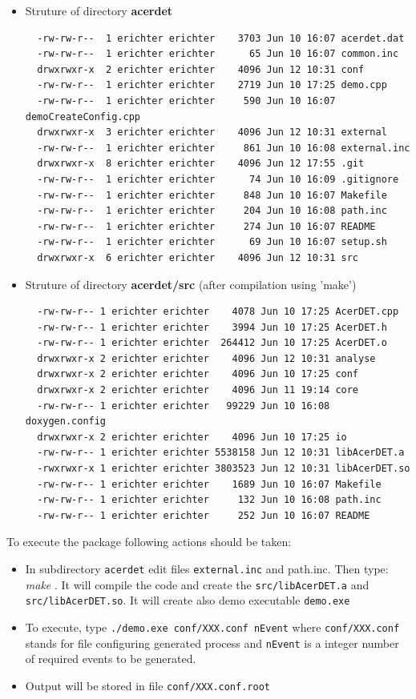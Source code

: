 \begin{itemize}
\item
Struture of directory {\bf acerdet}
{\scriptsize
\begin{verbatim}  
  -rw-rw-r--  1 erichter erichter    3703 Jun 10 16:07 acerdet.dat
  -rw-rw-r--  1 erichter erichter      65 Jun 10 16:07 common.inc
  drwxrwxr-x  2 erichter erichter    4096 Jun 12 10:31 conf
  -rw-rw-r--  1 erichter erichter    2719 Jun 10 17:25 demo.cpp
  -rw-rw-r--  1 erichter erichter     590 Jun 10 16:07 demoCreateConfig.cpp
  drwxrwxr-x  3 erichter erichter    4096 Jun 12 10:31 external
  -rw-rw-r--  1 erichter erichter     861 Jun 10 16:08 external.inc
  drwxrwxr-x  8 erichter erichter    4096 Jun 12 17:55 .git
  -rw-rw-r--  1 erichter erichter      74 Jun 10 16:09 .gitignore
  -rw-rw-r--  1 erichter erichter     848 Jun 10 16:07 Makefile
  -rw-rw-r--  1 erichter erichter     204 Jun 10 16:08 path.inc
  -rw-rw-r--  1 erichter erichter     274 Jun 10 16:07 README
  -rw-rw-r--  1 erichter erichter      69 Jun 10 16:07 setup.sh
  drwxrwxr-x  6 erichter erichter    4096 Jun 12 10:31 src
\end{verbatim} 
}
\item
Struture of directory {\bf acerdet/src} (after compilation using 'make')
{\scriptsize
\begin{verbatim}  
  -rw-rw-r-- 1 erichter erichter    4078 Jun 10 17:25 AcerDET.cpp
  -rw-rw-r-- 1 erichter erichter    3994 Jun 10 17:25 AcerDET.h
  -rw-rw-r-- 1 erichter erichter  264412 Jun 10 17:25 AcerDET.o
  drwxrwxr-x 2 erichter erichter    4096 Jun 12 10:31 analyse
  drwxrwxr-x 2 erichter erichter    4096 Jun 10 17:25 conf
  drwxrwxr-x 2 erichter erichter    4096 Jun 11 19:14 core
  -rw-rw-r-- 1 erichter erichter   99229 Jun 10 16:08 doxygen.config
  drwxrwxr-x 2 erichter erichter    4096 Jun 10 17:25 io
  -rw-rw-r-- 1 erichter erichter 5538158 Jun 12 10:31 libAcerDET.a
  -rwxrwxr-x 1 erichter erichter 3803523 Jun 12 10:31 libAcerDET.so
  -rw-rw-r-- 1 erichter erichter    1689 Jun 10 16:07 Makefile
  -rw-rw-r-- 1 erichter erichter     132 Jun 10 16:08 path.inc
  -rw-rw-r-- 1 erichter erichter     252 Jun 10 16:07 README
\end{verbatim} 
}
\end{itemize}


To execute the package following actions should be taken:
\begin{itemize}
\item
In subdirectory {\tt acerdet} edit files {\tt  external.inc} and {path.inc}.
Then type: {\it make }. It will
compile the code and create the {\tt src/libAcerDET.a} and {\tt src/libAcerDET.so}.
It will create also demo executable {\tt demo.exe}
\item
To execute, type  
\newline
{\tt ./demo.exe  conf/XXX.conf nEvent}
\newline
where  {\tt conf/XXX.conf} stands for file configuring generated process and 
{\tt nEvent} is a integer number of required events to be generated.
\item
Output will be stored in file  {\tt conf/XXX.conf.root}

\end{itemize}


